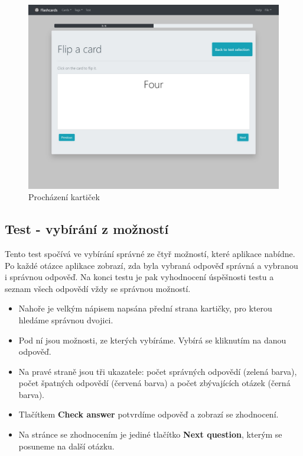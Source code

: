\documentclass[11pt]{article}
\providecommand{\tightlist}{\setlength{\itemsep}{1pt}\setlength{\parskip}{1pt}}
\begin{document}
\begin{figure}
\centering
\includegraphics{assets/browse.jpg}
\caption{Procházení kartiček}
\end{figure}

\hypertarget{test---vybuxedruxe1nuxed-z-moux17enostuxed}{%
\subsection{Test - vybírání z
možností}\label{test---vybuxedruxe1nuxed-z-moux17enostuxed}}

Tento test spočívá ve vybírání správné ze čtyř možností, které aplikace
nabídne. Po každé otázce aplikace zobrazí, zda byla vybraná odpověď
správná a vybranou i správnou odpověď. Na konci testu je pak vyhodnocení
úspěšnosti testu a seznam všech odpovědí vždy se správnou možností.

\begin{itemize}
\tightlist
\item
  Nahoře je velkým nápisem napsána přední strana kartičky, pro kterou
  hledáme správnou dvojici.
\item
  Pod ní jsou možnosti, ze kterých vybíráme. Vybírá se kliknutím na
  danou odpověď.
\item
  Na pravé straně jsou tři ukazatele: počet správných odpovědí (zelená
  barva), počet špatných odpovědí (červená barva) a počet zbývajících
  otázek (černá barva).
\item
  Tlačítkem \textbf{Check answer} potvrdíme odpověď a zobrazí se
  zhodnocení.
\item
  Na stránce se zhodnocením je jediné tlačítko \textbf{Next question},
  kterým se posuneme na další otázku.
\end{itemize}
\end{document}
